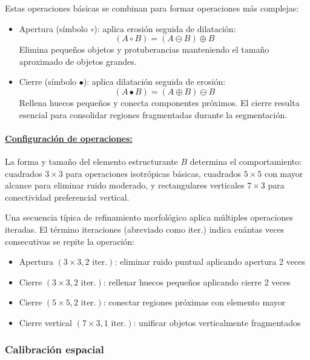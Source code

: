 Estas operaciones básicas se combinan para formar operaciones más complejas:

\begin{itemize}[label=$\bullet$]
\item Apertura (símbolo $\circ$): aplica erosión seguida de dilatación:
\begin{equation}
(A \circ B) = (A \ominus B) \oplus B
\end{equation}
Elimina pequeños objetos y protuberancias manteniendo el tamaño aproximado de objetos grandes.

\item Cierre (símbolo $\bullet$): aplica dilatación seguida de erosión:
\begin{equation}
(A \bullet B) = (A \oplus B) \ominus B
\end{equation}
Rellena huecos pequeños y conecta componentes próximos. El cierre resulta esencial para consolidar regiones fragmentadas durante la segmentación.
\end{itemize}

\paragraph{\underline{Configuración de operaciones:}}

La forma y tamaño del elemento estructurante $B$ determina el comportamiento: cuadrados $3 \times 3$ para operaciones isotrópicas básicas, cuadrados $5 \times 5$ con mayor alcance para eliminar ruido moderado, y rectangulares verticales $7 \times 3$ para conectividad preferencial vertical.

Una secuencia típica de refinamiento morfológico aplica múltiples operaciones iteradas. El término iteraciones (abreviado como iter.) indica cuántas veces consecutivas se repite la operación:
\begin{itemize}[label=$\bullet$]
\item Apertura $(3 \times 3, 2 \text{ iter.})$: eliminar ruido puntual aplicando apertura 2 veces
\item Cierre $(3 \times 3, 2 \text{ iter.})$: rellenar huecos pequeños aplicando cierre 2 veces
\item Cierre $(5 \times 5, 2 \text{ iter.})$: conectar regiones próximas con elemento mayor
\item Cierre vertical $(7 \times 3, 1 \text{ iter.})$: unificar objetos verticalmente fragmentados
\end{itemize}

\subsubsection{Calibración espacial}

